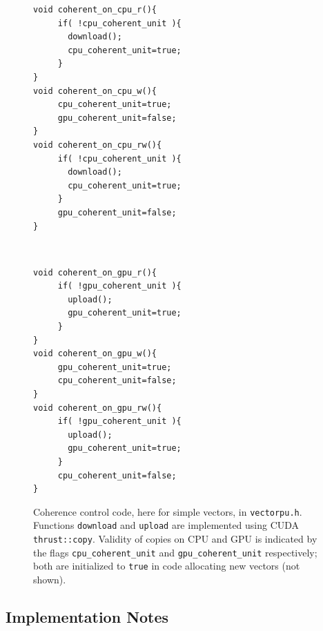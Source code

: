 \begin{figure}[tb]
\begin{minipage}{.48\textwidth}
\begin{small}
\begin{verbatim}
void coherent_on_cpu_r(){
  	 if( !cpu_coherent_unit ){
       download();
       cpu_coherent_unit=true;
  	 }
}
void coherent_on_cpu_w(){
  	 cpu_coherent_unit=true;
  	 gpu_coherent_unit=false;
}
void coherent_on_cpu_rw(){
  	 if( !cpu_coherent_unit ){
       download();
       cpu_coherent_unit=true;
  	 }
  	 gpu_coherent_unit=false;
}
\end{verbatim}
\end{small}
\end{minipage}\qquad~
\begin{minipage}{.48\textwidth}
\begin{small}
\begin{verbatim}
void coherent_on_gpu_r(){
  	 if( !gpu_coherent_unit ){
       upload();
       gpu_coherent_unit=true;
	 }
}
void coherent_on_gpu_w(){
  	 gpu_coherent_unit=true;
  	 cpu_coherent_unit=false;
}
void coherent_on_gpu_rw(){
  	 if( !gpu_coherent_unit ){
       upload();
       gpu_coherent_unit=true;
  	 }
  	 cpu_coherent_unit=false;
}
\end{verbatim}
\end{small}
\end{minipage}
\caption{\label{fig:vectorpucoherence}Coherence control code,
    here for simple vectors,
    in \texttt{vectorpu.h}. Functions \texttt{download} and
    \texttt{upload} are implemented using CUDA
    \texttt{thrust::copy}. Validity of copies on CPU and GPU
     is indicated
     by the flags \texttt{cpu\_coherent\_unit} and
     \texttt{gpu\_coherent\_unit} respectively; both are
     initialized to \texttt{true}
     in code allocating new vectors (not shown).}
\end{figure}




\subsection{Implementation Notes}

